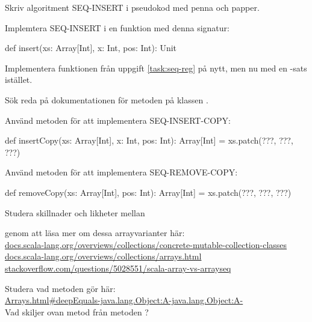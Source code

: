 \Subtask\Pen Skriv algoritment SEQ-INSERT i pseudokod med penna och papper.

\Subtask Implemtera SEQ-INSERT i en funktion med denna signatur:
\begin{Code}
def insert(xs: Array[Int], x: Int, pos: Int): Unit
\end{Code}

\Task Implementera funktionen  från uppgift \ref{task:seq-reg} på nytt, men nu med en -sats istället.



\AdvancedTasks %

\Task Sök reda på dokumentationen för metoden  på klassen .

\Subtask Använd metoden  för att implementera SEQ-INSERT-COPY: 
\begin{Code}
def insertCopy(xs: Array[Int], x: Int, pos: Int): Array[Int] = 
  xs.patch(???, ???, ???)
\end{Code}

\Subtask Använd metoden  för att  implementera SEQ-REMOVE-COPY: 
\begin{Code}
def removeCopy(xs: Array[Int], pos: Int): Array[Int] = 
  xs.patch(???, ???, ???)
\end{Code}

\Task Studera skillnader och likheter mellan 

\Subtask {}

\Subtask {}  

\Subtask {} 

\noindent genom att läsa mer om dessa arrayvarianter här: \\
\href{http://docs.scala-lang.org/overviews/collections/concrete-mutable-collection-classes}{docs.scala-lang.org/overviews/collections/concrete-mutable-collection-classes} \\  
\href{http://docs.scala-lang.org/overviews/collections/arrays.html}{docs.scala-lang.org/overviews/collections/arrays.html}  \\ 
\href{http://stackoverflow.com/questions/5028551/scala-array-vs-arrayseq}{stackoverflow.com/questions/5028551/scala-array-vs-arrayseq}   
    
    
\Task Studera vad metoden  gör här:\\
\href{https://docs.oracle.com/javase/8/docs/api/java/util/Arrays.html#deepEquals-java.lang.Object:A-java.lang.Object:A-}{Arrays.html\#deepEquals-java.lang.Object:A-java.lang.Object:A-} \\
Vad skiljer ovan metod från metoden ?

